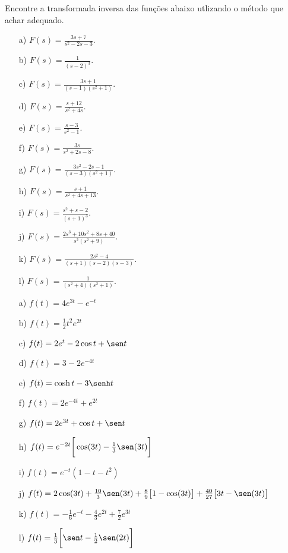 \begin{exer}
Encontre a transformada inversa das funções abaixo utlizando o método que achar adequado.
\begin{itemize}
\item[a)] $\displaystyle F(s)= \frac{3s + 7}{s^2 - 2 s - 3}$.
\item[b)] $\displaystyle F(s)= \frac{1}{(s-2)^3}$.
\item[c)] $\displaystyle F(s)= \frac{3s + 1}{(s-1)(s^2 +1)}$.
\item[d)] $\displaystyle F(s)= \frac{s + 12}{s^2 +4s}$.
\item[e)] $\displaystyle F(s)= \frac{s -3}{s^2 -1}$.
\item[f)] $\displaystyle F(s)= \frac{3s}{s^2 +2s -8}$.
\item[g)] $\displaystyle F(s)= \frac{3s^2 -2s - 1}{(s-3)(s^2 +1)}$.
\item[h)] $\displaystyle F(s)= \frac{s + 1}{s^2 +4s +13}$.
\item[i)] $\displaystyle F(s)= \frac{s^2 + s -2}{(s +1)^3}$.
\item[j)] $\displaystyle F(s)= \frac{2s^3 +10s^2+8s+40}{s^2(s^2 +9)}$.
\item[k)] $\displaystyle F(s)= \frac{2s^2 -4}{(s+1)(s-2)(s-3)}$.
\item[l)] $\displaystyle F(s)= \frac{1}{(s^2+4)(s^2 +1)}$.
\end{itemize}
\end{exer}
\begin{resp}
\begin{itemize}
  \item[a)] $f(t) = 4e^{3t} - e^{-t}$
  \item[b)] $f(t) = \frac{1}{2} t^2 e^{2t}$
  \item[c)] $f(t) = 2e^{t} - 2 \cos t + \sen t$
  \item[d)] $f(t) = 3 -2 e^{-4t}$
  \item[e)] $f(t) = \cosh t - 3 \senh t$
  \item[f)] $f(t) = 2e^{-4t} + e^{2t}$
  \item[g)] $f(t) = 2e^{3t} + \cos t + \sen t$
  \item[h)] $f(t) = e^{-2t}\bigg[ \cos(3t) - \frac{1}{3} \sen (3t) \bigg]$
  \item[i)] $f(t) = e^{-t}(1-t-t^2)$
  \item[j)] $f(t) = 2\cos(3t) +\frac{10}{3} \sen(3t) +\frac{8}{9} \big[1-\cos(3t)\big] + \frac{40}{27} \big[3t - \sen(3t)\big]$
  \item[k)] $f(t) = -\frac{1}{6} e^{-t} -\frac{4}{3} e^{2t} + \frac{7}{2} e^{3t}$
  \item[l)] $f(t) = \frac{1}{3} \bigg[ \sen t - \frac{1}{2}\sen(2t) \bigg]$
\end{itemize}
\end{resp}






